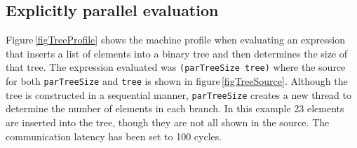 \documentclass{llncs}
\begin{document}
\subsection{Explicitly parallel evaluation}
Figure\,\ref{figTreeProfile} shows the machine profile when evaluating an expression that inserts a list of elements into a binary tree and then determines the size of that tree. The expression evaluated was \mbox{\texttt{(parTreeSize tree)}} where the source for both \texttt{parTreeSize} and \texttt{tree} is shown in figure\,\ref{figTreeSource}. Although the tree is constructed in a sequential manner, \texttt{parTreeSize} creates a new thread to determine the number of elements in each branch. In this example 23 elements are inserted into the tree, though they are not all shown in the source. The communication latency has been set to 100 cycles.
\end{document}
